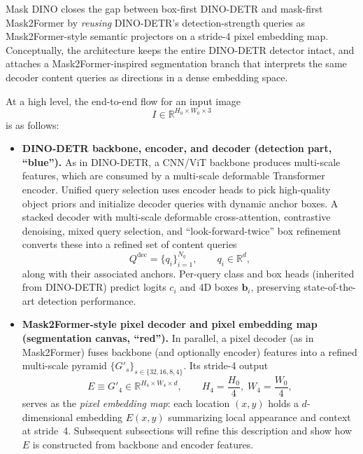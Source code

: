 \begin{enrichment}
\begin{enrichment}
		Mask DINO closes the gap between box-first DINO-DETR and mask-first Mask2Former by \emph{reusing} DINO-DETR's detection-strength queries as Mask2Former-style semantic projectors on a stride-4 pixel embedding map. Conceptually, the architecture keeps the entire DINO-DETR detector intact, and attaches a Mask2Former-inspired segmentation branch that interprets the same decoder content queries as directions in a dense embedding space.
		
		At a high level, the end-to-end flow for an input image
		\[
		I \in \mathbb{R}^{H_0 \times W_0 \times 3}
		\]
		is as follows:
		
		\begin{itemize}
			\item \textbf{DINO-DETR backbone, encoder, and decoder (detection part, ``blue'').} As in DINO-DETR, a CNN/ViT backbone produces multi-scale features, which are consumed by a multi-scale deformable Transformer encoder. Unified query selection uses encoder heads to pick high-quality object priors and initialize decoder queries with dynamic anchor boxes. A stacked decoder with multi-scale deformable cross-attention, contrastive denoising, mixed query selection, and ``look-forward-twice'' box refinement converts these into a refined set of content queries
			\[
			Q^{\text{dec}} = \{q_i\}_{i=1}^{N_q}, \qquad q_i \in \mathbb{R}^d,
			\]
			along with their associated anchors. Per-query class and box heads (inherited from DINO-DETR) predict logits $c_i$ and 4D boxes $\mathbf{b}_i$, preserving state-of-the-art detection performance.
			
			\item \textbf{Mask2Former-style pixel decoder and pixel embedding map (segmentation canvas, ``red'').} In parallel, a pixel decoder (as in Mask2Former) fuses backbone (and optionally encoder) features into a refined multi-scale pyramid $\{G'_s\}_{s \in \{32,16,8,4\}}$. Its stride-4 output
			\[
			E \equiv G'_4 \in \mathbb{R}^{H_4 \times W_4 \times d}, \qquad H_4 = \frac{H_0}{4}, \; W_4 = \frac{W_0}{4},
			\]
			serves as the \emph{pixel embedding map}: each location $(x,y)$ holds a $d$-dimensional embedding $E(x,y)$ summarizing local appearance and context at stride~4. Subsequent subsections will refine this description and show how $E$ is constructed from backbone and encoder features.
			

\end{itemize}
\end{enrichment}
\end{enrichment}
